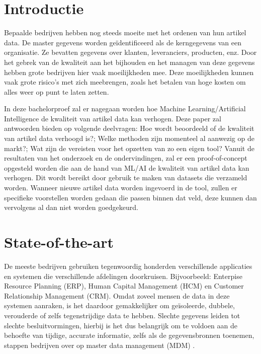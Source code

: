 
\section{Introductie}%
\label{sec:introductie}

Bepaalde bedrijven hebben nog steeds moeite met het ordenen van hun artikel data. De master gegevens worden geïdentificeerd als de kerngegevens van een organisatie. Ze bevatten gegevens over klanten, leveranciers, producten, enz. Door het gebrek van de kwaliteit aan het bijhouden en het managen van deze gegevens hebben grote bedrijven hier vaak moeilijkheden mee. Deze moeilijkheden kunnen vaak grote risico’s met zich meebrengen, zoals het betalen van hoge kosten om alles weer op punt te laten zetten. 

In deze bachelorproef zal er nagegaan worden hoe Machine Learning/Artificial Intelligence de kwaliteit van artikel data kan verhogen. Deze paper zal antwoorden bieden op volgende deelvragen: Hoe wordt beoordeeld of de kwaliteit van artikel data verhoogd is?; Welke methoden zijn momenteel al aanwezig op de markt?; Wat zijn de vereisten voor het opzetten van zo een eigen tool? Vanuit de resultaten van het onderzoek en de ondervindingen, zal er een proof-of-concept opgesteld worden die aan de hand van ML/AI de kwaliteit van artikel data kan verhogen. Dit wordt bereikt door gebruik te maken van datasets die verzameld worden. Wanneer nieuwe artikel data worden ingevoerd in de tool, zullen er specifieke voorstellen worden gedaan die passen binnen dat veld, deze kunnen dan vervolgens al dan niet worden goedgekeurd.


\section{State-of-the-art}%
\label{sec:state-of-the-art}


De meeste bedrijven gebruiken tegenwoordig honderden verschillende applicaties en systemen die verschillende afdelingen doorkruisen. Bijvoorbeeld: Enterpise Resource Planning (ERP), Human Capital Management (HCM) en Customer Relationship Management (CRM). Omdat zoveel mensen de data in deze systemen aanraken, is het daardoor gemakkelijker om geïsoleerde, dubbele, verouderde of zelfs tegenstrijdige data te hebben. Slechte gegevens leiden tot slechte besluitvormingen, hierbij is het dus belangrijk om te voldoen aan de behoefte van tijdige, accurate informatie, zelfs als de gegevensbronnen toenemen, stappen bedrijven over op master data management (MDM) \autocite{SAP}.

